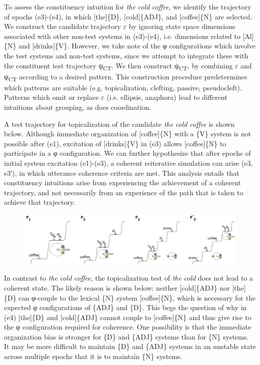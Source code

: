   To assess the constituency intuition for \textit{the} \textit{cold} \textit{coffee}, we identify the trajectory of epochs (e3)-(e4), in which [the]\{D\}, [cold]\{ADJ\}, and [coffee]\{N\} are selected. We construct the candidate trajectory $\varepsilon $ by ignoring state space dimensions associated with other non-test systems in (e3)-(e4), i.e. dimensions related to [Al]\{N\} and [drinks]\{V\}. However, we take note of the φ configurations which involve the test systems and non-test systems, since we attempt to integrate these with the constituent test trajectory ψ\textsubscript{CT}. We then construct ψ\textsubscript{CT}, by combining $\varepsilon $ and ψ\textsubscript{CT} according to a desired pattern. This construction procedure predetermines which patterns are suitable (e.g. topicalization, clefting, passive, pseudocleft). Patterns which omit or replace $\varepsilon $ (i.e. ellipsis, anaphora) lead to different intuitions about grouping, as does coordination.

  A test trajectory for topicalization of the candidate \textit{the} \textit{cold} \textit{coffee} is shown below. Although immediate organization of [coffee]\{N\} with a \{V\} system is not possible after (e1), excitation of [drinks]\{V\} in (e3) allows [coffee]\{N\} to participate in a φ configuration. We can further hypothesize that after epochs of initial system excitation (e1)-(e3), a coherent reiterative simulation can arise (e3, e3′), in which utterance coherence criteria are met. This analysis entails that constituency intuitions arise from experiencing the achievement of a coherent trajectory, and not necessarily from an experience of the path that is taken to achieve that trajectory.

  
\begin{figure}
\includegraphics[width=\textwidth]{figures/Tilsen-img138.png}
\caption{\missingcaption}
\label{fig:}
\end{figure}
 

  In contrast to \textit{the} \textit{cold} \textit{coffee}, the topicalization test of \textit{the} \textit{cold} does not lead to a coherent state. The likely reason is shown below: neither [cold]\{ADJ\} nor [the]\{D\} can φ-couple to the lexical \{N\} system [coffee]\{N\}, which is necessary for the expected φ configurations of \{ADJ\} and \{D\}. This begs the question of why in (e4) [the]\{D\} and [cold]\{ADJ\} cannot couple to [coffee]\{N\} and thus give rise to the φ configuration required for coherence. One possibility is that the immediate organization bias is stronger for \{D\} and \{ADJ\} systems than for \{N\} systems. It may be more difficult to maintain \{D\} and \{ADJ\} systems in an unstable state across multiple epochs that it is to maintain \{N\} systems.

